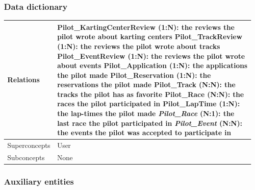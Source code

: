 \documentclass{beamer}
\begin{document}
\begin{frame}
    \frametitle{Data dictionary}
    \begin{table}
    \tiny
    \begin{tabular}{|p{2cm}|p{6cm}|}
    \hline
    Relations &
    Pilot\_KartingCenterReview (1:N): the reviews the pilot wrote about karting centers \newline
    Pilot\_TrackReview (1:N): the reviews the pilot wrote about tracks \newline
    Pilot\_EventReview (1:N): the reviews the pilot wrote about events \newline
    Pilot\_Application (1:N): the applications the pilot made \newline
    Pilot\_Reservation (1:N): the reservations the pilot made \newline
    Pilot\_Track (N:N): the tracks the pilot has as favorite \newline
    Pilot\_Race (N:N): the races the pilot participated in \newline
    Pilot\_LapTime (1:N): the lap-times the pilot made \newline
    \textit{Pilot\_Race} (N:1): the last race the pilot participated in \newline
    \textit{Pilot\_Event} (N:N): the events the pilot was accepted to participate in \\
    \hline
    Superconcepts & User \\
    \hline
    Subconcepts & None \\
    \hline
    \end{tabular}
    \end{table}
\end{frame}

\subsubsection{Auxiliary entities}
\end{document}
